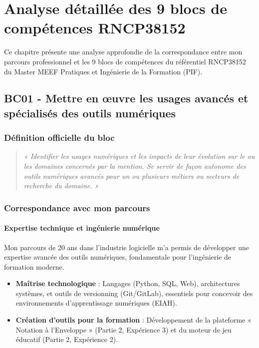 \chapter{Analyse détaillée des 9 blocs de compétences RNCP38152}

Ce chapitre présente une analyse approfondie de la correspondance entre mon parcours professionnel et les 9 blocs de compétences du référentiel RNCP38152 du Master MEEF Pratiques et Ingénierie de la Formation (PIF).

\section{BC01 - Mettre en œuvre les usages avancés et spécialisés des outils numériques}

\subsection{Définition officielle du bloc}
\begin{quote}
\textit{« Identifier les usages numériques et les impacts de leur évolution sur le ou les domaines concernés par la mention. Se servir de façon autonome des outils numériques avancés pour un ou plusieurs métiers ou secteurs de recherche du domaine. »} \parencite{rncp38152}
\end{quote}

\subsection{Correspondance avec mon parcours}

\subsubsection{Expertise technique et ingénierie numérique}
Mon parcours de 20 ans dans l'industrie logicielle m'a permis de développer une expertise avancée des outils numériques, fondamentale pour l'ingénierie de formation moderne.
\begin{itemize}[leftmargin=*]
    \item \textbf{Maîtrise technologique} : Langages (Python, SQL, Web), architectures systèmes, et outils de versionning (Git/GitLab), essentiels pour concevoir des environnements d'apprentissage numériques (EIAH).
    \item \textbf{Création d'outils pour la formation} : Développement de la plateforme « Notation à l'Enveloppe » (Partie 2, Expérience 3) et du moteur de jeu éducatif (Partie 2, Expérience 2).
\end{itemize}

